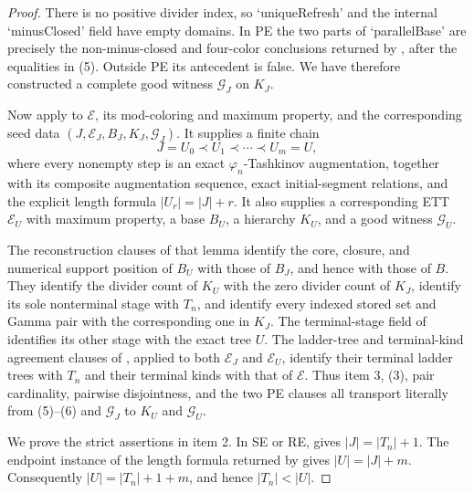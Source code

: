 \begin{proof}
There is no positive divider index, so `uniqueRefresh' and the internal
`minusClosed' field have empty domains.  In PE the two parts of
`parallelBase' are precisely the non-minus-closed and four-color
conclusions returned by , after the
equalities in (5).  Outside PE its antecedent is false.  We have therefore
constructed a complete good witness $\mathcal G_J$ on $K_J$.

Now apply  to
$\mathcal E$, its mod-coloring and maximum property, and the corresponding
seed data $(J,\mathcal E_J,B_J,K_J,\mathcal G_J)$.  It supplies a finite
chain
\[
                         J=U_0\prec U_1\prec\cdots\prec U_m=U, \tag{9}
\]
where every nonempty step is an exact
$\varphi_n$-Tashkinov augmentation, together with its composite
augmentation sequence, exact initial-segment relations, and the explicit
length formula $|U_r|=|J|+r$.  It also supplies a corresponding ETT
$\mathcal E_U$ with maximum property, a base $B_U$, a hierarchy $K_U$, and
a good witness $\mathcal G_U$.

The reconstruction clauses of that lemma identify the core, closure, and
numerical support position of $B_U$ with those of $B_J$, and hence with
those of $B$.  They identify the divider count of $K_U$ with the zero
divider count of $K_J$, identify its sole nonterminal stage with $T_n$,
and identify every indexed stored set and Gamma pair with the corresponding
one in $K_J$.  The terminal-stage field of
 identifies its other stage with the exact
tree $U$.  The ladder-tree and terminal-kind agreement clauses of
, applied to both
$\mathcal E_J$ and $\mathcal E_U$, identify their terminal ladder trees
with $T_n$ and their terminal kinds with that of $\mathcal E$.  Thus item
3, (3), pair cardinality, pairwise disjointness, and the two PE clauses all
transport literally from (5)--(6) and $\mathcal G_J$ to $K_U$ and
$\mathcal G_U$.

We prove the strict assertions in item 2.  In SE or RE,
 gives $|J|=|T_n|+1$.  The endpoint instance
of the length formula returned by
 gives $|U|=|J|+m$.
Consequently $|U|=|T_n|+1+m$, and hence $|T_n|<|U|$.


\end{proof}

